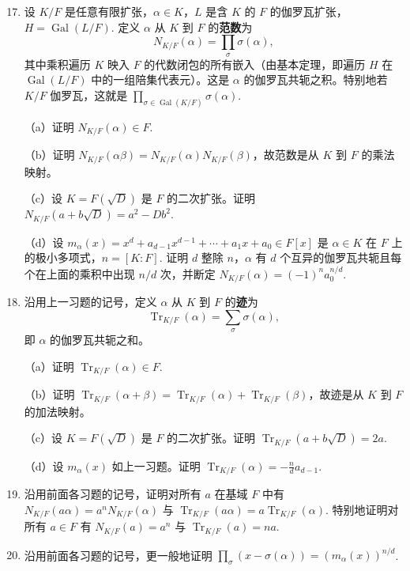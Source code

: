 \begin{enumerate}
\setcounter{enumi}{16}
\item 设 \(K/F\) 是任意有限扩张，\(\alpha \in K\)，\(L\) 是含 \(K\) 的 \(F\) 的伽罗瓦扩张，\(H = \operatorname{Gal}(L/F)\). 定义 \(\alpha\) 从 \(K\) 到 \(F\) 的\textbf{范数}为
\[
N_{K/F}(\alpha) = \prod_{\sigma}\sigma(\alpha),
\]
其中乘积遍历 \(K\) 映入 \(F\) 的代数闭包的所有嵌入（由基本定理，即遍历 \(H\) 在 \(\operatorname{Gal}(L/F)\) 中的一组陪集代表元）。这是 \(\alpha\) 的伽罗瓦共轭之积。特别地若 \(K/F\) 伽罗瓦，这就是 \(\prod_{\sigma \in \operatorname{Gal}(K/F)}\sigma(\alpha)\).

（a）证明 \(N_{K/F}(\alpha) \in F\).

（b）证明 \(N_{K/F}(\alpha\beta) = N_{K/F}(\alpha)N_{K/F}(\beta)\)，故范数是从 \(K\) 到 \(F\) 的乘法映射。

（c）设 \(K = F(\sqrt{D})\) 是 \(F\) 的二次扩张。证明 \(N_{K/F}(a+b\sqrt{D}) = a^2-Db^2\).

（d）设 \(m_\alpha(x) = x^d+a_{d-1}x^{d-1}+\cdots+a_1x+a_0 \in F[x]\) 是 \(\alpha \in K\) 在 \(F\) 上的极小多项式，\(n = [K:F]\). 证明 \(d\) 整除 \(n\)，\(\alpha\) 有 \(d\) 个互异的伽罗瓦共轭且每个在上面的乘积中出现 \(n/d\) 次，并断定 \(N_{K/F}(\alpha) = (-1)^na_0^{n/d}\).

\item 沿用上一习题的记号，定义 \(\alpha\) 从 \(K\) 到 \(F\) 的\textbf{迹}为
\[
\operatorname{Tr}_{K/F}(\alpha) = \sum_{\sigma}\sigma(\alpha),
\]
即 \(\alpha\) 的伽罗瓦共轭之和。

（a）证明 \(\operatorname{Tr}_{K/F}(\alpha) \in F\).

（b）证明 \(\operatorname{Tr}_{K/F}(\alpha+\beta) = \operatorname{Tr}_{K/F}(\alpha)+\operatorname{Tr}_{K/F}(\beta)\)，故迹是从 \(K\) 到 \(F\) 的加法映射。

（c）设 \(K = F(\sqrt{D})\) 是 \(F\) 的二次扩张。证明 \(\operatorname{Tr}_{K/F}(a+b\sqrt{D}) = 2a\).

（d）设 \(m_\alpha(x)\) 如上一习题。证明 \(\operatorname{Tr}_{K/F}(\alpha) = -\frac{n}{d}a_{d-1}\).

\item 沿用前面各习题的记号，证明对所有 \(a\) 在基域 \(F\) 中有 \(N_{K/F}(a\alpha) = a^nN_{K/F}(\alpha)\) 与 \(\operatorname{Tr}_{K/F}(a\alpha) = a\operatorname{Tr}_{K/F}(\alpha)\). 特别地证明对所有 \(a \in F\) 有 \(N_{K/F}(a) = a^n\) 与 \(\operatorname{Tr}_{K/F}(a) = na\).

\item 沿用前面各习题的记号，更一般地证明 \(\prod_{\sigma}(x-\sigma(\alpha)) = (m_\alpha(x))^{n/d}\).


\end{enumerate}
